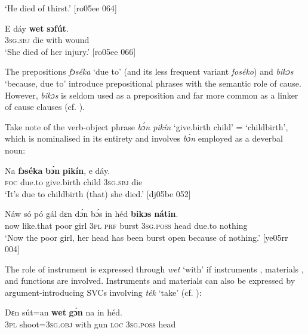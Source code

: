 \glt ‘He died of thirst.’ [ro05ee 064]
\z


\ea%
    \label{ex:key:1062}
    \gll E    dáy  \textbf{wet}    \textbf{sɔfút}.\\
\textsc{3sg.sbj}  die  with    wound\\

\glt ‘She died of her injury.’ [ro05ee 066]
\z

The prepositions \textit{fɔséka} ‘due to’ (and its less frequent variant \textit{foséko})  and \textit{bikɔs} ‘because, due to’  introduce prepositional phrases with the semantic role of cause. However, \textit{bikɔs} is seldom used as a preposition and far more common as a linker of cause clauses (cf. ). 


Take note of the verb-object phrase \textit{bɔ́n pikín} ‘give.birth child’ = ‘childbirth’, which is nominalised in its entirety and involves \textit{bɔ́n} employed as a deverbal noun: 



\ea%
    \label{ex:key:1063}
    \gll Na  \textbf{fɔséka}  \textbf{bɔ́n}     \textbf{pikín},  e    dáy.\\
\textsc{foc}  due.to  give.birth  child  \textsc{3sg.sbj}  die\\

\glt ‘It’s due to childbirth (that) she died.’ [dj05be 052]
\z


\ea%
    \label{ex:key:1064}
    \gll Náw  só    pó    gál  dɛn  dɔ́n  bɔ́s    in    héd
\textbf{bikɔs}  \textbf{nátin}.\\
now  like.that  poor  girl  \textsc{3pl}  \textsc{prf}  burst  \textsc{3sg.poss}  head
due.to  nothing\\

\glt ‘Now the poor girl, her head has been burst open 
because of nothing.’ [ye05rr 004]
\z

The role of instrument is expressed through \textit{wet} ‘with’ if instruments , materials , and functions  are involved. Instruments and materials can also be expressed by argument-introducing SVCs involving \textit{ték} ‘take’ (cf. ):


\ea%
    \label{ex:key:1065}
    \gll Dɛn  sút=an    \textbf{wet}    \textbf{gɔ́n}  na  in    héd.\\
\textsc{3pl}  shoot=\textsc{3sg.obj}  with    gun  \textsc{loc}  \textsc{3sg.poss}  head\\

